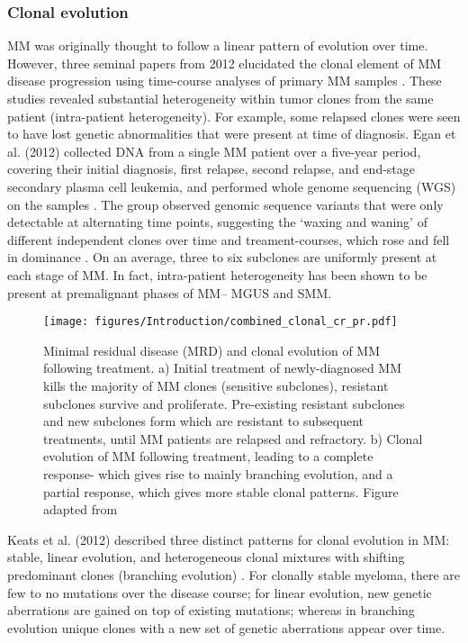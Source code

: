 \subsubsection{Clonal evolution}
MM was originally thought to follow a linear pattern of evolution over time.
However, three seminal papers from 2012 elucidated the clonal element of MM disease progression using time-course analyses of primary MM samples \cite{egan2012whole, keats2012clonal, walker2012intraclonal}.
These studies revealed substantial heterogeneity within tumor clones from the same patient (intra-patient heterogeneity).
For example, some relapsed clones were seen to have lost genetic abnormalities that were present at time of diagnosis.
Egan et al. (2012) collected DNA from a single MM patient over a five-year period, covering their initial diagnosis, first relapse, second relapse, and end-stage secondary plasma cell leukemia, and performed whole genome sequencing (WGS) on the samples \cite{egan2012whole}.
The group observed genomic sequence variants that were only detectable at alternating time points, suggesting the `waxing and waning' of different independent clones over time and treament-courses, which rose and fell in dominance \cite{egan2012whole}.
On an average, three to six subclones are uniformly present at each stage of MM.
In fact, intra-patient heterogeneity has been shown to be present at premalignant phases of MM-- MGUS and SMM\@.
%
\begin{figure}[htb]
\centering
\texttt{[image: figures/Introduction/combined\_clonal\_cr\_pr.pdf]}
\caption[Clonal evolution of MM with treatment]{Minimal residual disease (MRD) and clonal evolution of MM following treatment.
a) Initial treatment of newly-diagnosed MM kills the majority of MM clones (sensitive subclones), resistant subclones survive and proliferate.
Pre-existing resistant subclones and new subclones form which are resistant to subsequent treatments, until MM patients are relapsed and refractory.
b) Clonal evolution of MM following treatment, leading to a complete response- which gives rise to mainly branching evolution, and a partial response, which gives more stable clonal patterns.
Figure adapted from \cite{jones2019clonal}
}
\label{fig:mrd_clones}
\end{figure}

Keats et al. (2012) described three distinct patterns for clonal evolution in MM: stable, linear evolution, and heterogeneous clonal mixtures with shifting predominant clones (branching evolution) \cite{keats2012clonal}.
For clonally stable myeloma, there are few to no mutations over the disease course;
for linear evolution, new genetic aberrations are gained on top of existing mutations;
whereas in branching evolution unique clones with a new set of genetic aberrations appear over time.

